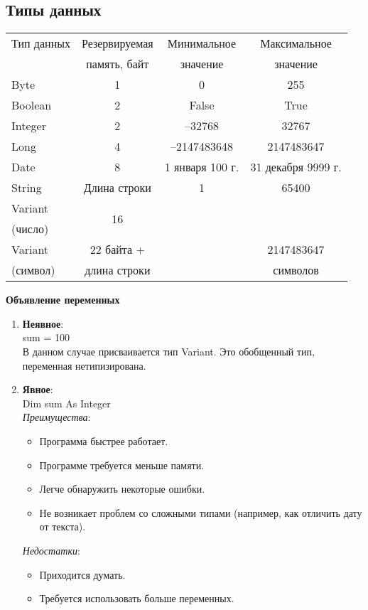 \subsection{Типы данных}
\begin{minipage}{\textwidth}
\centering
\begin{tabular}{|l|c|c|c|}
\hline
Тип данных & Резервируемая & Минимальное & Максимальное \\
& память, байт & значение & значение \\
\hline
Byte & 1 & 0 & 255 \\
Boolean & 2 & False & True \\
Integer & 2 & --32768 & 32767 \\
Long & 4 & --2147483648 & 2147483647 \\
Date & 8 & 1 января 100 г. & 31 декабря 9999 г. \\
String & Длина строки & 1 & 65400 \\
Variant & \multirow{2}{*}{16} & & \\
(число) & & & \\
Variant & 22 байта + & & 2147483647 \\
(символ) & длина строки & & символов \\
\hline
\end{tabular}
\end{minipage}
\begin{center}
 \textbf{Объявление переменных}
\end{center}
\begin{enumerate}
  \item \textbf{Неявное}:
  \\sum = 100
  \\В данном случае присваивается тип Variant. Это обобщенный тип, переменная нетипизирована.
  \item \textbf{Явное}:
  \\Dim sum As Integer
  \\\emph{Преимущества}:
  \begin{itemize}
    \item Программа быстрее работает.
    \item Программе требуется меньше памяти.
    \item Легче обнаружить некоторые ошибки.
   \item Не возникает проблем со сложными типами (например, как отличить дату от текста).
  \end{itemize}
  \emph{Недостатки}:
  \begin{itemize}
    \item Приходится думать.
    \item Требуется использовать больше переменных.
  \end{itemize}
\end{enumerate}
